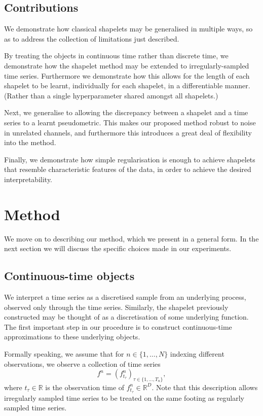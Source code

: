 \documentclass{article}
\theoremstyle{plain}
\theoremstyle{definition}
\newcommand{\reals}{\mathbb{R}}
\begin{document}
	\subsection{Contributions} %
	We demonstrate how classical shapelets may be generalised in multiple ways, so as to address the collection of limitations just described.
	
	By treating the objects in continuous time rather than discrete time, we demonstrate how the shapelet method may be extended to irregularly-sampled time series. Furthermore we demonstrate how this allows for the length of each shapelet to be learnt, individually for each shapelet, in a differentiable manner. (Rather than a single hyperparameter shared amongst all shapelets.)
	
	Next, we generalise to allowing the discrepancy between a shapelet and a time series to a learnt pseudometric. This makes our proposed method robust to noise in unrelated channels, and furthermore this introduces a great deal of flexibility into the method.
	
	Finally, we demonstrate how simple regularisation is enough to achieve shapelets that resemble characteristic features of the data, in order to achieve the desired interpretability.
	
	\section{Method}
	We move on to describing our method, which we present in a general form. In the next section we will discuss the specific choices made in our experiments.
	
	\subsection{Continuous-time objects}
	We interpret a time series as a discretised sample from an underlying process, observed only through the time series. Similarly, the shapelet previously constructed may be thought of as a discretisation of some underlying function. The first important step in our procedure is to construct continuous-time approximations to these underlying objects.
	
	Formally speaking, we assume that for $n \in \{1, \ldots, N\}$ indexing different observations, we observe a collection of time series
	\begin{equation*}
	f^n = (f^n_{t_\tau})_{\tau \in \{1, \ldots, T_n\}},
	\end{equation*}
	where $t_\tau \in \reals$ is the observation time of $f^n_{t_\tau} \in \reals^D$. Note that this description allows irregularly sampled time series to be treated on the same footing as regularly sampled time series.
	
\end{document}
